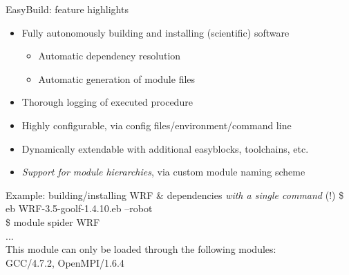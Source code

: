\documentclass[10pt,xcolor={usenames,dvipsnames}]{beamer}
\begin{document}
\begin{frame}{EasyBuild: feature highlights}
\begin{itemize}
    \item
        Fully autonomously building and installing (scientific) software
        \begin{itemize}
            \item
                Automatic dependency resolution
            \item
                Automatic generation of module files
        \end{itemize}
    \item
        Thorough logging of executed procedure
    \item
        Highly configurable, via config files/environment/command line
    \item
        Dynamically extendable with additional easyblocks, toolchains, etc.
    \item
        \emph{Support for module hierarchies}, via custom module naming scheme
\end{itemize}
\quad\quad
\begin{minipage}{0.9\textwidth}
    \begin{exampleblock}{Example: building/installing WRF \& dependencies \emph{with a single command} (!)}
        \ttfamily
        \$ eb WRF-3.5-goolf-1.4.10.eb --robot\\
        \$ module spider WRF\\
        ...\\
        This module can only be loaded through the following modules:\\
        GCC/4.7.2, OpenMPI/1.6.4
    \end{exampleblock}
\end{minipage}
\end{frame}

\end{document}
